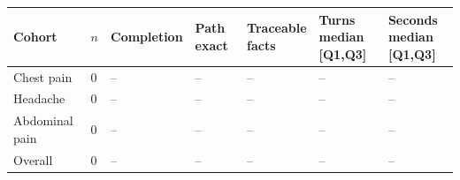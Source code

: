 \begin{tabular}{lllllll}
\hline
Cohort & $n$ & Completion & Path exact & \shortstack{Traceable\\facts} & \shortstack{Turns\\median [Q1,Q3]} & \shortstack{Seconds\\median [Q1,Q3]} \\
\hline
Chest pain & 0 & -- & -- & -- & -- & -- \\
Headache & 0 & -- & -- & -- & -- & -- \\
Abdominal pain & 0 & -- & -- & -- & -- & -- \\
Overall & 0 & -- & -- & -- & -- & -- \\
\hline
\end{tabular}

